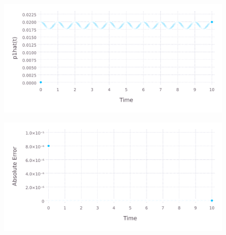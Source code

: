 \documentclass{ifacconf}
\begin{document}
\clearpage
\begin{figure}[h]
	\label{fig:p1hat}
	\includegraphics[scale=0.9]{p1hat.pdf}
\end{figure}

\begin{figure}[h]
	\label{fig:error}
	\includegraphics[scale=0.9]{error.pdf}
\end{figure}
\end{document}

